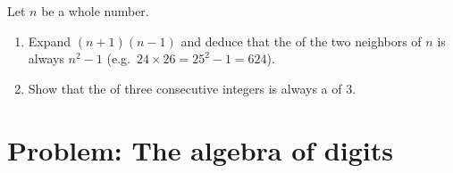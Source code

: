 \begin{exercise}[$\star\star\star$]\label{exo:g9:algebra:10}
Let $n$ be a whole number.
\begin{enumerate}
  \item Expand $(n + 1)(n - 1)$ and deduce that the  of the two
        neighbors of $n$ is always $n^2 - 1$ (e.g.\ $24 \times 26 =
        25^2 - 1 = 624$).
  \item Show that the  of three consecutive integers is always a
         of $3$.
\end{enumerate}
\end{exercise}

\section{Problem: The algebra of digits}

